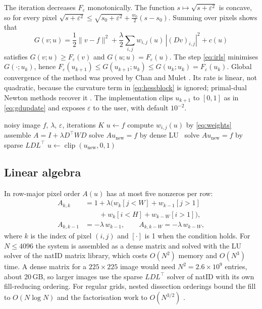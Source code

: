 \documentclass[conference,a4paper]{IEEEtran}
\newcommand{\norm}[1]{\lVert #1\rVert}
\DeclareMathOperator{\clip}{clip}
\begin{document}
The iteration decreases $F_\varepsilon$ monotonically. The function $s\mapsto\sqrt{s+\varepsilon^2}$ is concave, so for every pixel $\sqrt{s+\varepsilon^2}\le\sqrt{s_0+\varepsilon^2}+\frac{w_0}{2}(s-s_0)$. Summing over pixels shows that
\begin{equation}
G(v;u)=\frac12\norm{v-f}^2+\frac\lambda2\sum_{i,j}w_{i,j}(u)\,|(Dv)_{i,j}|^2+c(u)
\label{eq:majorizer}
\end{equation}
satisfies $G(v;u)\ge F_\varepsilon(v)$ and $G(u;u)=F_\varepsilon(u)$. The step \eqref{eq:irls} minimises $G(\cdot;u_k)$, hence $F_\varepsilon(u_{k+1})\le G(u_{k+1};u_k)\le G(u_k;u_k)=F_\varepsilon(u_k)$. Global convergence of the method was proved by Chan and Mulet \cite{chan1999mulet}. Its rate is linear, not quadratic, because the curvature term in \eqref{eq:hessblock} is ignored; primal-dual Newton methods recover it \cite{chan1999primaldual}. The implementation clips $u_{k+1}$ to $[0,1]$ as in \eqref{eq:gdupdate} and exposes $\varepsilon$ to the user, with default $10^{-2}$.

\begin{algorithm}[t]
\caption{Lagged diffusivity (Newton-type) iteration}\label{alg:irls}
\begin{algorithmic}[1]
\Require noisy image $f$, $\lambda$, $\varepsilon$, iterations $K$
\State $u\gets f$
  \State compute $w_{i,j}(u)$ by \eqref{eq:weights}
  \State assemble $A=I+\lambda D^\top W D$ 
   solve $Au_{\mathrm{new}}=f$ by dense LU
  \Else\ solve $Au_{\mathrm{new}}=f$ by sparse $LDL^\top$
  \EndIf
  \State $u\gets\clip(u_{\mathrm{new}},0,1)$
\EndFor
\end{algorithmic}
\end{algorithm}

\subsection{Linear algebra}

In row-major pixel order $A(u)$ has at most five nonzeros per row:
\begin{align}
A_{k,k}&=1+\lambda\bigl(w_k[j<W]+w_{k-1}[j>1]\nonumber\\
&\qquad+w_k[i<H]+w_{k-W}[i>1]\bigr),\label{eq:diag}\\
A_{k,k-1}&=-\lambda\,w_{k-1},\qquad A_{k,k-W}=-\lambda\,w_{k-W},\label{eq:offdiag}
\end{align}
where $k$ is the index of pixel $(i,j)$ and $[\cdot]$ is 1 when the condition holds. For $N\le4096$ the system is assembled as a dense matrix and solved with the LU solver of the natID matrix library, which costs $O(N^2)$ memory and $O(N^3)$ time. A dense matrix for a $225\times225$ image would need $N^2=2.6\times10^9$ entries, about 20\,GB, so larger images use the sparse $LDL^\top$ solver of natID with its own fill-reducing ordering. For regular grids, nested dissection orderings bound the fill to $O(N\log N)$ and the factorisation work to $O(N^{3/2})$ \cite{george1973,davis2006}.
\end{document}
